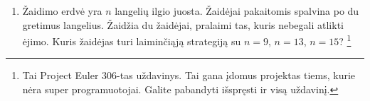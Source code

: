 \begin{enumerate}

  \item Žaidimo erdvė yra $n$ langelių ilgio juosta. Žaidėjai pakaitomis spalvina
    po du gretimus langelius. Žaidžia du žaidėjai, pralaimi tas, kuris nebegali
    atlikti ėjimo. Kuris žaidėjas turi laiminčiąją strategiją su $n=9$, $n=13$,
    $n=15$? \footnote{Tai Project Euler 306-tas uždavinys. Tai gana įdomus projektas
    tiems, kurie nėra super programuotojai. Galite pabandyti išspręsti ir visą
    uždavinį.}


\end{enumerate}
